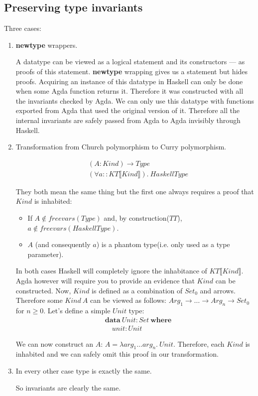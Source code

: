 \subsection{Preserving type invariants}

Three cases:
\begin{enumerate}
\item \textbf{newtype} wrappers.

A datatype can be viewed as a logical statement and its constructors --- as
proofs of this statement. \textbf{newtype} wrapping gives us a statement but
hides proofs. Acquiring an instance of this datatype in Haskell can only be done
when some Agda function returns it. Therefore it was constructed with all the invariants
checked by Agda. We can only use this datatype with functions exported from Agda that
used the original version of it. Therefore all the internal invariants are safely passed
from Agda to Agda invisibly through Haskell.

\item Transformation from Church polymorphism to Curry polymorphism.

\begin{align*}
&(A : Kind) \rightarrow Type \\
&(\forall a :: KT\llbracket Kind \rrbracket).\ HaskellType
\end{align*}

They both mean the same thing but the first one always requires a proof that
\(Kind\) is inhabited:

\begin{itemize}
\item If \(A \not\in freevars(Type)\) and, by construction(\(TT\)), \(a \not\in freevars(HaskellType)\).
\item \(A\) (and consequently \(a\)) is a phantom type(i.e. only used as a type parameter).
\end{itemize}

In both cases Haskell will completely ignore the inhabitance of \(KT\llbracket Kind \rrbracket\).
Agda however will require you to provide an evidence that \(Kind\) can be constructed. Now,
\(Kind\) is defined as a combination of \(Set_0\) and arrows. Therefore some \(Kind\ A\) can be viewed as
follows: \(Arg_1 \rightarrow \ldots \rightarrow Arg_n \rightarrow Set_0\) for \(n \ge 0\).
Let's define a simple \(Unit\) type:
\begin{align*}
   &\mathbf{data}\ Unit : Set\ \mathbf{where}\\
   &\quad unit : Unit
\end{align*}

We can now construct an \(A\): \(A = \lambda arg_1 \ldots arg_n.\ Unit\). Therefore, each \(Kind\)
is inhabited and we can safely omit this proof in our transformation.

\item In every other case type is exactly the same.

So invariants are clearly the same.
\end{enumerate}

